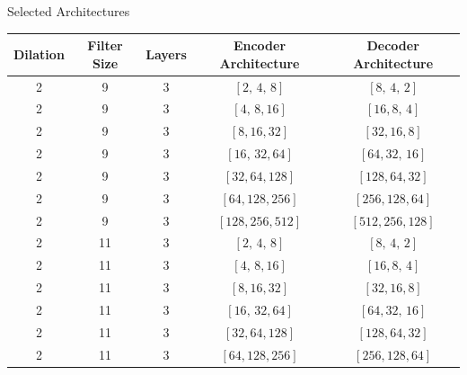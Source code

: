 \documentclass[8pt,xcolor=dvipsnames,compress]{beamer}
\begin{document}

\begin{frame}{Selected Architectures}
\footnotesize
\begin{table}[h!]
    \centering
    \renewcommand{\arraystretch}{1.4}
    \begin{tabular}{|c|c|c|c|c|}
        \hline
        \textbf{Dilation} & \textbf{Filter Size} & \textbf{Layers} & \textbf{Encoder Architecture} & \textbf{Decoder Architecture} \\
        \hline
        2 & 9 & 3 & $[2,\,4,\,8]$ & $[8,\,4,\,2]$ \\
        2 & 9 & 3 & $[4,\,8,16]$ & $[16,8,\,4]$ \\
        2 & 9 & 3 & $[8,16,32]$ & $[32,16,8]$ \\
        2 & 9 & 3 & $[16,\,32,64]$ & $[64,32,\,16]$ \\
        2 & 9 & 3 & $[32,64,128]$ & $[128,64,32]$ \\
        2 & 9 & 3 & $[64,128,256]$ & $[256,128,64]$ \\
        2 & 9 & 3 & $[128,256,512]$ & $[512,256,128]$ \\
        \hline
        2 & 11 & 3 & $[2,\,4,\,8]$ & $[8,\,4,\,2]$ \\
        2 & 11 & 3 & $[4,\,8,16]$ & $[16,8,\,4]$ \\
        2 & 11 & 3 & $[8,16,32]$ & $[32,16,8]$ \\
        2 & 11 & 3 & $[16,\,32,64]$ & $[64,32,\,16]$ \\
        2 & 11 & 3 & $[32,64,128]$ & $[128,64,32]$ \\
        2 & 11 & 3 & $[64,128,256]$ & $[256,128,64]$ \\
        \hline
    \end{tabular}
    \label{tab:tcn_architectures}
\end{table}
\end{frame}
\end{document}
